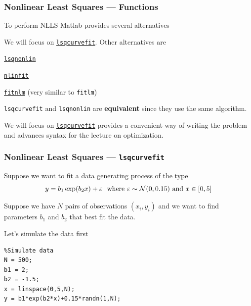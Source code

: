 \documentclass[11pt,xcolor={svgnames},aspectratio=169,usepdftitle=false]{beamer}
\let\toneitemize\itemize
\let\ttwoitemize\enditemize
\renewenvironment{itemize}{\toneitemize\addtolength{\itemsep}{0.7\baselineskip}}{\ttwoitemize}
\begin{document}
\begin{frame}[fragile]
  \frametitle{Nonlinear Least Squares --- Functions}
\begin{itemize}
  \item To perform NLLS Matlab provides several alternatives
  \item We will focus on \href{https://www.mathworks.com/help/optim/ug/lsqcurvefit.html}{\texttt{lsqcurvefit}}. Other alternatives are
  \begin{itemize}
    \item \href{https://www.mathworks.com/help/optim/ug/lsqnonlin.html}{\texttt{lsqnonlin}}
    \item \href{https://www.mathworks.com/help/stats/nlinfit.html}{\texttt{nlinfit}}
    \item \href{https://www.mathworks.com/help/stats/fitnlm.html}{\texttt{fitnlm}} (very similar to \texttt{fitlm})
  \end{itemize}
  \item \texttt{lsqcurvefit} and \texttt{lsqnonlin} are \alert{\textbf{equivalent}} since they use the same algorithm.
  \item We will focus on \href{https://www.mathworks.com/help/optim/ug/lsqcurvefit.html}{\texttt{lsqcurvefit}} provides a convenient way of writing the problem and advances syntax for the lecture on optimization.
\end{itemize}
\end{frame}

\begin{frame}[fragile]
  \frametitle{Nonlinear Least Squares --- \texttt{lsqcurvefit}}
  \begin{itemize}
    \item Suppose we want to fit a data generating process of the type
    \[
    y = b_1 \exp(b_2 x) + \varepsilon \ \text{ where } \varepsilon \thicksim \mathcal{N}(0,0.15) \text{ and } x\in [0,5]
    \]
    \item Suppose we have $N$ pairs of observations $(x_i,y_i)$ and we want to find parameters $b_1$ and $b_2$ that best fit the data.
    \item Let's simulate the data first
  \end{itemize}
\begin{lstlisting}
%Simulate data
N = 500;
b1 = 2;
b2 = -1.5;
x = linspace(0,5,N);
y = b1*exp(b2*x)+0.15*randn(1,N);
\end{lstlisting}
\end{frame}
\end{document}
